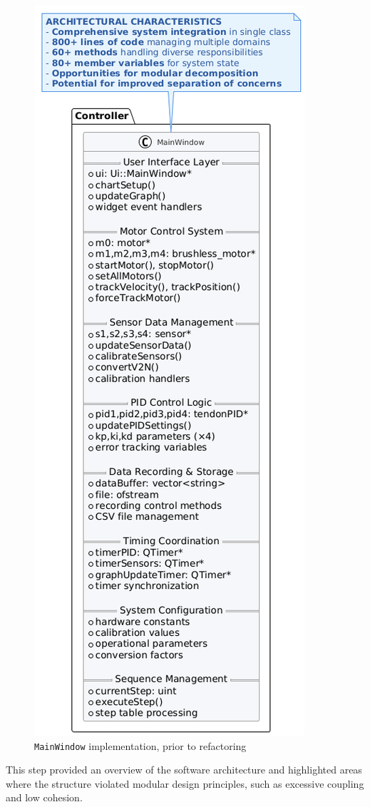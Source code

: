  \begin{figure}
    \centering
    \includegraphics[width=\linewidth]{images/Software documentation/old code/mainwindow2.png}
    \caption{\texttt{MainWindow} implementation, prior to refactoring}
    \label{fig:oldmainwindow}
\end{figure}This step provided an overview of the software architecture and highlighted areas where the structure violated modular design principles, such as excessive coupling and low cohesion. 

